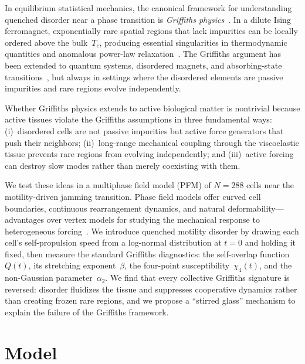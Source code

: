 \documentclass[aps,pre,twocolumn,superscriptaddress,longbibliography,floatfix]{revtex4-2}
\begin{document}
In equilibrium statistical mechanics, the canonical framework for
understanding quenched disorder near a phase transition is
\emph{Griffiths physics}~\cite{griffiths1969}.  In a dilute Ising
ferromagnet, exponentially rare spatial regions that lack impurities
can be locally ordered above the bulk~$T_c$, producing essential
singularities in thermodynamic quantities and anomalous power-law
relaxation~\cite{griffiths1969,fisher1992,vojta2006}.  The Griffiths
argument has been extended to quantum systems, disordered magnets, and
absorbing-state transitions~\cite{vojta2019}, but always in settings
where the disordered elements are passive impurities and rare regions
evolve independently.

Whether Griffiths physics extends to active biological matter is
nontrivial because active tissues violate the Griffiths assumptions
in three fundamental ways: (i)~disordered cells are not passive
impurities but active force generators that push their neighbors;
(ii)~long-range mechanical coupling through the viscoelastic tissue
prevents rare regions from evolving independently; and (iii)~active
forcing can destroy slow modes rather than merely coexisting with them.

We test these ideas in a multiphase field model (PFM) of $N = 288$
cells near the motility-driven jamming transition.  Phase field models
offer curved cell boundaries, continuous rearrangement dynamics, and
natural deformability---advantages over vertex models for studying the
mechanical response to heterogeneous
forcing~\cite{nonomura2012,palmieri2015,najem2016}.  We introduce
quenched motility disorder by drawing each cell's self-propulsion
speed from a log-normal distribution at $t\!=\!0$ and holding it
fixed, then measure the standard Griffiths diagnostics: the
self-overlap function~$Q(t)$, its stretching exponent~$\beta$, the
four-point susceptibility~$\chi_4(t)$, and the non-Gaussian
parameter~$\alpha_2$.  We find that every collective Griffiths
signature is reversed: disorder fluidizes the tissue and suppresses
cooperative dynamics rather than creating frozen rare regions, and we
propose a ``stirred glass'' mechanism to explain the failure of the
Griffiths framework.

\section{Model}
\label{sec:model}
\end{document}
